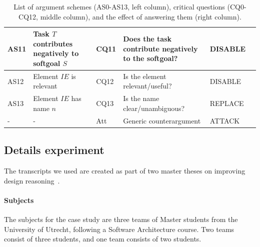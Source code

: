 \begin{table}[h]
\begin{tabularx}{\textwidth}{|l|l|l|X|l|l|}
\hline
AS11 & Task $T$ contributes negatively to softgoal $S$& CQ11 & Does the task contribute negatively to the softgoal?& DISABLE\\
\hline
\hline
AS12 & Element $IE$ is relevant & CQ12 & Is the element relevant/useful? & DISABLE\\
\hline
AS13 & Element $IE$ has name $n$ & CQ13 & Is the name clear/unambiguous? & REPLACE\\
\hline
\hline
- & - & Att & Generic counterargument & ATTACK\\
\hline
\end{tabularx}
\caption{List of argument schemes (AS0-AS13, left column), critical questions (CQ0-CQ12, middle column), and the effect of answering them (right column).}
\label{table:argument-schemes}
\end{table}

\subsection{Details experiment}

The transcripts we used are created as part of two master theses on improving design reasoning~\cite{masterthesis1,masterthesis2}.

\paragraph{Subjects} The subjects for the case study are three teams of Master students from the University of Utrecht, following a Software Architecture course. Two teams consist of three students, and one team consists of two students.


